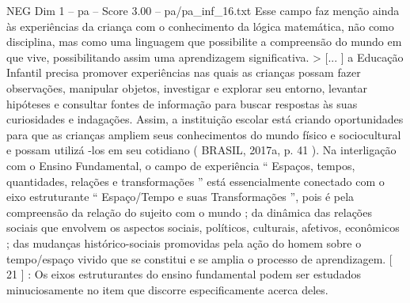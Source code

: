 \begin{textsample}{NEG Dim 1 – pa – Score 3.00 – pa/pa\_inf\_16.txt}
Esse campo faz menção ainda às experiências da criança com o conhecimento da lógica matemática, não como disciplina, mas como uma linguagem que possibilite a compreensão do mundo em que vive, possibilitando assim uma aprendizagem significativa. > [... ] a Educação Infantil precisa promover experiências nas quais as crianças possam fazer observações, manipular objetos, investigar e explorar seu entorno, levantar hipóteses e consultar fontes de informação para buscar respostas às suas curiosidades e indagações.
Assim, a instituição escolar está criando oportunidades para que as crianças ampliem seus conhecimentos do mundo físico e sociocultural e possam utilizá -los em seu cotidiano ( BRASIL, 2017a, p. 41 ).
Na interligação com o Ensino Fundamental, o campo de experiência “ Espaços, tempos, quantidades, relações e transformações ” está essencialmente conectado com o eixo estruturante “ Espaço/Tempo e suas Transformações ”, pois é pela compreensão da relação do sujeito com o mundo ; da dinâmica das relações sociais que envolvem os aspectos sociais, políticos, culturais, afetivos, econômicos ; das mudanças histórico-sociais promovidas pela ação do homem sobre o tempo/espaço vivido que se constitui e se amplia o processo de aprendizagem. [ 21 ] : Os eixos estruturantes do ensino fundamental podem ser estudados minuciosamente no item que discorre especificamente acerca deles.

\end{textsample}
